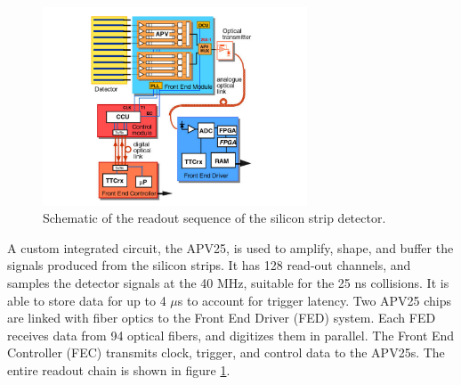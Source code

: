 \begin{figure}[h]
   \centering
  \includegraphics[width=0.7\textwidth]{Figures/CMS_Diagrams/Tracker__Silicon_Strip_Readout.pdf}
  \caption{Schematic of the readout sequence of the silicon strip
    detector.} \label{fig:tracker_strip_readout}
\end{figure}

\par A custom integrated circuit, the APV25, is used to amplify,
shape, and buffer the signals produced from the silicon strips.  It
has 128 read-out channels, and samples the detector signals at the 40
MHz, suitable for the 25 ns collisions.  It is able to store data for
up to 4 $\mu$s to account for trigger latency.  Two APV25 chips are
linked with fiber optics to the Front End Driver (FED) system.  Each
FED receives data from 94 optical fibers, and digitizes them in
parallel.  The Front End Controller (FEC) transmits clock, trigger,
and control data to the APV25s.  The entire readout chain is shown in
figure \ref{fig:tracker_strip_readout}. 

